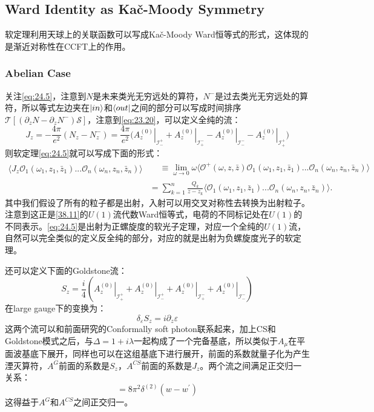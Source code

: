 \subsection{Ward Identity as Ka\v{c}-Moody Symmetry}
软定理利用天球上的关联函数可以写成Ka\v{c}-Moody Ward恒等式的形式，这体现的是渐近对称性在CCFT上的作用。
\subsubsection{Abelian Case}
关注\ref{eq:24.5}，注意到$N$是未来类光无穷远处的算符，$N^-$是过去类光无穷远处的算符，所以等式左边夹在$\ket{in}$和$\bra{out}$之间的部分可以写成时间排序$\mathcal{T}\left[\left(\partial_zN-\partial_zN^-\right)\mathcal{S}\right]$，注意到\ref{eq:23.20}，可以定义全纯的流：
\begin{equation}
	J_z=-\frac{4\pi}{e^2}\left(N_z-N_z^-\right)=\frac{4\pi}{e^2}\bigl(\left.A_z^{(0)}\right|_{\mathcal{I}_-^+}+\left.A_z^{(0)}\right|_{\mathcal{I}_+^-}-\left.A_z^{(0)}\right|_{\mathcal{I}_-^-}-\left.A_z^{(0)}\right|_{\mathcal{I}_+^+}\bigr)
\end{equation}
则软定理\ref{eq:24.5}就可以写成下面的形式：
\begin{equation}
	\begin{aligned}
		\langle J_z\mathcal{O}_1(\omega_1,z_1,\bar{z}_1)...\mathcal{O}_n(\omega_n,z_n,\bar{z}_n)\rangle & \begin{aligned}&\equiv\lim_{\omega\to0}\omega\langle\mathcal{O}^+(\omega,z,\bar{z})\mathcal{O}_1(\omega_1,z_1,\bar{z}_1)...\mathcal{O}_n(\omega_n,z_n,\bar{z}_n)\rangle\end{aligned}  \\
		&=\sum_{k=1}^n\frac{Q_k}{z-z_k}\langle\mathcal{O}_1(\omega_1,z_1,\bar{z}_1)...\mathcal{O}_n(\omega_n,z_n,\bar{z}_n)\rangle.
	\end{aligned}
\end{equation}
其中我们假设了所有的粒子都是出射，入射可以用交叉对称性去转换为出射粒子。注意到这正是\ref{38.11}的$U(1)$流代数Ward恒等式，电荷的不同标记处在$U(1)$的不同表示。\ref{eq:24.5}是出射为正螺旋度的软光子定理，对应一个全纯的$U(1)$流，自然可以完全类似的定义反全纯的部分，对应的就是出射为负螺旋度光子的软定理。

还可以定义下面的Goldstone流\cite{Nande:2017dba}：
\begin{equation}
	S_z=\frac i4\left(\left.A_z^{(0)}\right|_{\mathcal{I}_+^+}+\left.A_z^{(0)}\right|_{\mathcal{I}_-^+}+\left.A_z^{(0)}\right|_{\mathcal{I}_+^-}+\left.A_z^{(0)}\right|_{\mathcal{I}_-^-}\right)
\end{equation}
在large gauge下的变换为：
\begin{equation}
	\delta_\varepsilon S_z=i\partial_z\varepsilon 
\end{equation}
这两个流可以和前面研究的Conformally soft photon联系起来，加上CS和Goldstone模式之后，与$\Delta=1+i\lambda$一起构成了一个完备基底，所以类似于$A_\mu$在平面波基底下展开，同样也可以在这组基底下进行展开，前面的系数就量子化为产生湮灭算符，$A^G$前面的系数是$S_z$，$A^{CS}$前面的系数是$J_z$\cite{Donnay:2018neh}。两个流之间满足正交归一关系：
\begin{equation}
	[J_w(w),S_{w^\prime}(w^\prime)]=8\pi^2\delta^{(2)}(w-w^\prime)
\end{equation}
这得益于$A^G$和$A^{CS}$之间正交归一。
